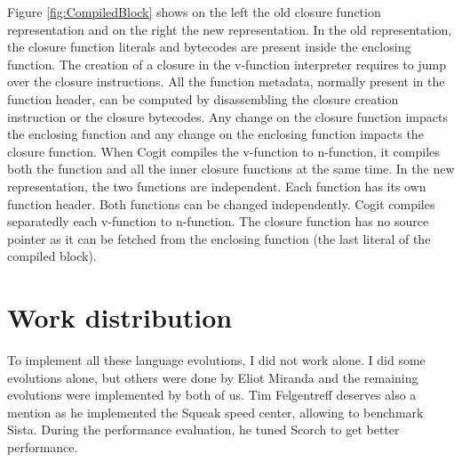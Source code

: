 \documentclass[a4paper,12pt,twoside]{../includes/ThesisStyle}
\begin{document}
Figure \ref{fig:CompiledBlock} shows on the left the old closure function representation and on the right the new representation. In the old representation, the closure function literals and bytecodes are present inside the enclosing function. The creation of a closure in the v-function interpreter requires to jump over the closure instructions. All the function metadata, normally present in the function header, can be computed by disassembling the closure creation instruction or the closure bytecodes. Any change on the closure function impacts the enclosing function and any change on the enclosing function impacts the closure function. When Cogit compiles the v-function to n-function, it compiles both the function and all the inner closure functions at the same time. In the new representation, the two functions are independent. Each function has its own function header. Both functions can be changed independently. Cogit compiles separatedly each v-function to n-function. The closure function has no source pointer as it can be fetched from the enclosing function (the last literal of the compiled block).


\section{Work distribution}
\label{sec:WorkDistrib}

To implement all these language evolutions, I did not work alone. I did some evolutions alone, but others were done by Eliot Miranda and the remaining evolutions were implemented by both of us. Tim Felgentreff deserves also a mention as he implemented the Squeak speed center, allowing to benchmark Sista. During the performance evaluation, he tuned Scorch to get better performance.
\end{document}
